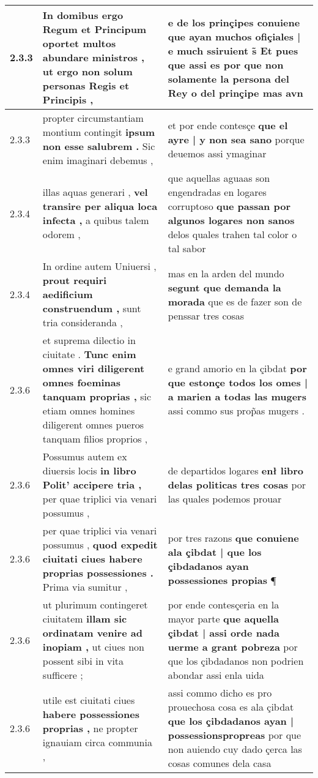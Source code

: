 \begin{tabular}{|p{1cm}|p{6.5cm}|p{6.5cm}|}
2.3.3 & In domibus ergo Regum et Principum \textbf{ oportet multos abundare ministros , } ut ergo non solum personas Regis et Principis , & e de los prinçipes conuiene \textbf{ que ayan muchos ofiçiales | e much ssiruient s̃ Et pues que assi es } por que non solamente la persona del Rey o del prinçipe mas avn \\\hline
2.3.3 & propter circumstantiam montium contingit \textbf{ ipsum non esse salubrem . } Sic enim imaginari debemus , & et por ende contesçe \textbf{ que el ayre | y non sea sano } porque deuemos assi ymaginar \\\hline
2.3.4 & illas aquas generari , \textbf{ vel transire per aliqua loca infecta , } a quibus talem odorem , & que aquellas aguaas son engendradas en logares corruptoso \textbf{ que passan por algunos logares non sanos } delos quales trahen tal color o tal sabor \\\hline
2.3.4 & In ordine autem Uniuersi , \textbf{ prout requiri aedificium construendum , } sunt tria consideranda , & mas en la arden del mundo \textbf{ segunt que demanda la morada } que es de fazer son de penssar tres cosas \\\hline
2.3.6 & et suprema dilectio in ciuitate . \textbf{ Tunc enim omnes viri diligerent omnes foeminas tanquam proprias , } sic etiam omnes homines diligerent omnes pueros tanquam filios proprios , & e grand amorio en la çibdat \textbf{ por que estonçe todos los omes | a marien a todas las mugers } assi commo sus prop̃as mugers . \\\hline
2.3.6 & Possumus autem ex diuersis locis \textbf{ in libro Polit’ accipere tria , } per quae triplici via venari possumus , & de departidos logares \textbf{ enł libro delas politicas tres cosas } por las quales podemos prouar \\\hline
2.3.6 & per quae triplici via venari possumus , \textbf{ quod expedit ciuitati ciues habere proprias possessiones . } Prima via sumitur , & por tres razons \textbf{ que conuiene ala çibdat | que los çibdadanos ayan possessiones propias } ¶ \\\hline
2.3.6 & ut plurimum contingeret ciuitatem \textbf{ illam sic ordinatam venire ad inopiam , } ut ciues non possent sibi in vita sufficere ; & por ende contesçeria en la mayor parte \textbf{ que aquella çibdat | assi orde nada uerme a grant pobreza } por que los çibdadanos non podrien abondar assi enla uida \\\hline
2.3.6 & utile est ciuitati ciues \textbf{ habere possessiones proprias , } ne propter ignauiam circa communia , & assi commo dicho es pro prouechosa cosa es ala çibdat \textbf{ que los çibdadanos ayan | possessionspropreas } por que non auiendo cuy dado çerca las cosas comunes dela casa \\\hline

\end{tabular}
